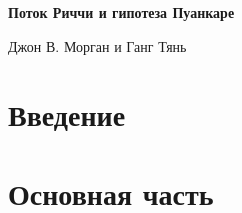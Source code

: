 \documentclass{article}
\begin{document}
\begin{center}
    \huge\textbf{Поток Риччи и гипотеза Пуанкаре}

    \huge{Джон В. Морган и Ганг Тянь}
\end{center}
\newpage
\newpage
\tableofcontents
\newpage
\chapter{Введение}

\newpage
\chapter{Основная часть}

\end{document}
